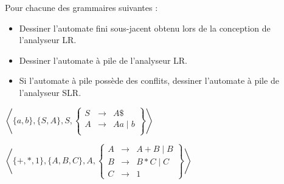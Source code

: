 
\begingroup

\begin{exercice}[Parser LR]\label{exo:parsing/LR_parser/parser}

  Pour chacune des grammaires suivantes :
  \begin{itemize}
  \item Dessiner l'automate fini sous-jacent obtenu lors de la conception de l'analyseur LR.
  \item Dessiner l'automate à pile de l'analyseur LR.
  \item Si l'automate à pile possède des conflits, dessiner l'automate à pile de l'analyseur SLR.
  \end{itemize}

  \begin{questions}
  \item $\left\langle \{a, b\}, \{S, A\}, S,
    \left\{\begin{array}{lll}
    S   &\rightarrow& A \$\\
    A   &\rightarrow& Aa \mid  b\\
    \end{array}\right\}\right\rangle$

  \item $\left\langle \{ +, *, 1\}, \{A, B, C\}, A,
    \left\{\begin{array}{lll}
    A   &\rightarrow& A + B \mid  B \\
    B   &\rightarrow& B * C \mid C \\
    C   &\rightarrow& 1
    \end{array}\right\}\right\rangle$

  \end{questions}

\end{exercice}


